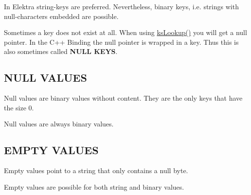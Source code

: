 In Elektra string-\/keys are preferred. Nevertheless, binary keys, i.\+e. strings with null-\/characters embedded are possible.

Sometimes a key does not exist at all. When using \hyperlink{group__keyset_gaa34fc43a081e6b01e4120daa6c112004}{ks\+Lookup()} you will get a null pointer. In the C++ Binding the null pointer is wrapped in a key. Thus this is also sometimes called {\bfseries N\+U\+LL K\+E\+YS}.

\subsection*{N\+U\+LL V\+A\+L\+U\+ES}

Null values are binary values without content. They are the only keys that have the size 0.

Null values are always binary values.

\subsection*{E\+M\+P\+TY V\+A\+L\+U\+ES}

Empty values point to a string that only contains a null byte.

Empty values are possible for both string and binary values. 